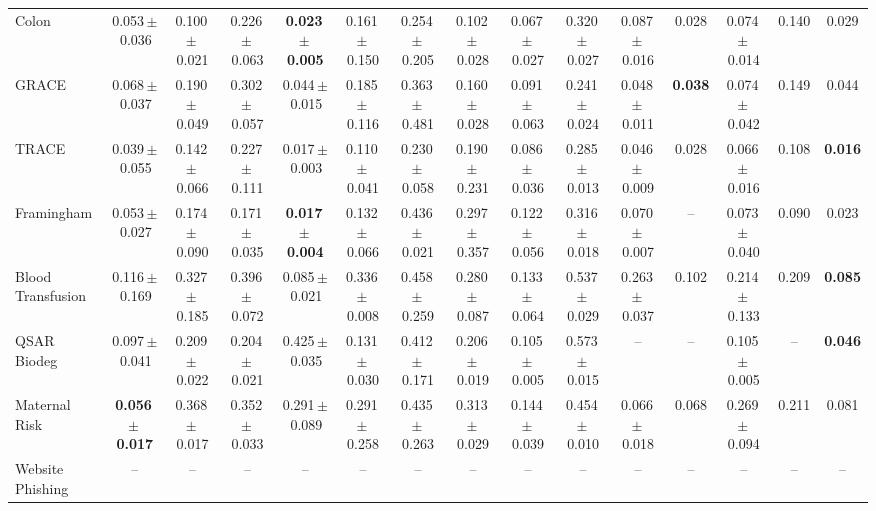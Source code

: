 \documentclass[8pt]{extarticle}
\begin{document}
\begin{longtable}{l*{14}{c}}
Colon & 0.053\,$\pm$\,0.036 & 0.100\,$\pm$\,0.021 & 0.226\,$\pm$\,0.063 & \textbf{0.023\,$\pm$\,0.005} & 0.161\,$\pm$\,0.150 & 0.254\,$\pm$\,0.205 & 0.102\,$\pm$\,0.028 & 0.067\,$\pm$\,0.027 & 0.320\,$\pm$\,0.027 & 0.087\,$\pm$\,0.016 & 0.028 & 0.074\,$\pm$\,0.014 & 0.140 & 0.029 \\
GRACE & 0.068\,$\pm$\,0.037 & 0.190\,$\pm$\,0.049 & 0.302\,$\pm$\,0.057 & 0.044\,$\pm$\,0.015 & 0.185\,$\pm$\,0.116 & 0.363\,$\pm$\,0.481 & 0.160\,$\pm$\,0.028 & 0.091\,$\pm$\,0.063 & 0.241\,$\pm$\,0.024 & 0.048\,$\pm$\,0.011 & \textbf{0.038} & 0.074\,$\pm$\,0.042 & 0.149 & 0.044 \\
TRACE & 0.039\,$\pm$\,0.055 & 0.142\,$\pm$\,0.066 & 0.227\,$\pm$\,0.111 & 0.017\,$\pm$\,0.003 & 0.110\,$\pm$\,0.041 & 0.230\,$\pm$\,0.058 & 0.190\,$\pm$\,0.231 & 0.086\,$\pm$\,0.036 & 0.285\,$\pm$\,0.013 & 0.046\,$\pm$\,0.009 & 0.028 & 0.066\,$\pm$\,0.016 & 0.108 & \textbf{0.016} \\
Framingham & 0.053\,$\pm$\,0.027 & 0.174\,$\pm$\,0.090 & 0.171\,$\pm$\,0.035 & \textbf{0.017\,$\pm$\,0.004} & 0.132\,$\pm$\,0.066 & 0.436\,$\pm$\,0.021 & 0.297\,$\pm$\,0.357 & 0.122\,$\pm$\,0.056 & 0.316\,$\pm$\,0.018 & 0.070\,$\pm$\,0.007 & -- & 0.073\,$\pm$\,0.040 & 0.090 & 0.023 \\
Blood Transfusion & 0.116\,$\pm$\,0.169 & 0.327\,$\pm$\,0.185 & 0.396\,$\pm$\,0.072 & 0.085\,$\pm$\,0.021 & 0.336\,$\pm$\,0.008 & 0.458\,$\pm$\,0.259 & 0.280\,$\pm$\,0.087 & 0.133\,$\pm$\,0.064 & 0.537\,$\pm$\,0.029 & 0.263\,$\pm$\,0.037 & 0.102 & 0.214\,$\pm$\,0.133 & 0.209 & \textbf{0.085} \\
QSAR Biodeg & 0.097\,$\pm$\,0.041 & 0.209\,$\pm$\,0.022 & 0.204\,$\pm$\,0.021 & 0.425\,$\pm$\,0.035 & 0.131\,$\pm$\,0.030 & 0.412\,$\pm$\,0.171 & 0.206\,$\pm$\,0.019 & 0.105\,$\pm$\,0.005 & 0.573\,$\pm$\,0.015 & -- & -- & 0.105\,$\pm$\,0.005 & -- & \textbf{0.046} \\
Maternal Risk & \textbf{0.056\,$\pm$\,0.017} & 0.368\,$\pm$\,0.017 & 0.352\,$\pm$\,0.033 & 0.291\,$\pm$\,0.089 & 0.291\,$\pm$\,0.258 & 0.435\,$\pm$\,0.263 & 0.313\,$\pm$\,0.029 & 0.144\,$\pm$\,0.039 & 0.454\,$\pm$\,0.010 & 0.066\,$\pm$\,0.018 & 0.068 & 0.269\,$\pm$\,0.094 & 0.211 & 0.081 \\
Website Phishing & -- & -- & -- & -- & -- & -- & -- & -- & -- & -- & -- & -- & -- & -- \\
\end{longtable}
\end{document}
